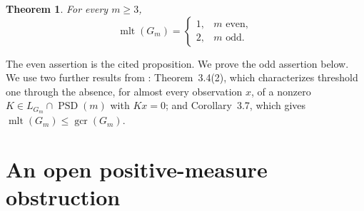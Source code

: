 \documentclass[11pt]{article}
\newtheorem{theorem}{Theorem}
\newcommand{\PSD}{\operatorname{PSD}}
\newcommand{\mlt}{\operatorname{mlt}}
\newcommand{\gcr}{\operatorname{gcr}}
\begin{document}
\begin{theorem}\label{thm:main}
For every $m\geq3$,
\[
 \mlt(G_m)=
 \begin{cases}
 1,&m\text{ even},\\
 2,&m\text{ odd}.
 \end{cases}
\]
\end{theorem}

The even assertion is the cited proposition.  We prove the odd assertion
below.  We use two further results from \cite{HomsKuznetsovaStolz2026}:
Theorem~3.4(2), which characterizes threshold one through the absence, for
almost every observation $x$, of a nonzero $K\in L_{G_m}\cap\PSD(m)$ with
$Kx=0$; and Corollary~3.7, which gives $\mlt(G_m)\leq\gcr(G_m)$.

\section{An open positive-measure obstruction}
\end{document}
